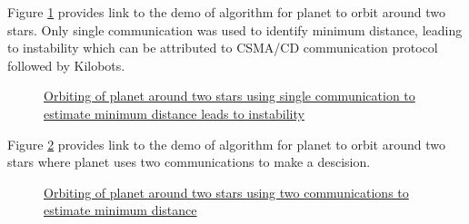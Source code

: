 \documentclass{report}[12pt]
\begin{document}
Figure \ref{fig:orbit_two_star_comm1} provides link to the demo of algorithm for planet to orbit around two stars. Only single communication was used to identify minimum distance, leading to instability which can be attributed to CSMA/CD \cite{WEBOPEDIA-csma-cd} communication protocol followed by Kilobots.
\begin{figure}[H]
	\centering
	\caption{\href{https://youtu.be/mhW04WvGKuQ}{Orbiting of planet around two stars using single communication to estimate minimum distance leads to instability}}
	\label{fig:orbit_two_star_comm1}
\end{figure}

Figure \ref{fig:orbit_two_star} provides link to the demo of algorithm for planet to orbit around two stars where planet uses two communications to make a descision.
\begin{figure}[H]
	\centering
	\caption{\href{https://youtu.be/EKvty2OxXxM}{Orbiting of planet around two stars using two communications to estimate minimum distance}}
	\label{fig:orbit_two_star}
\end{figure}
\end{document}
